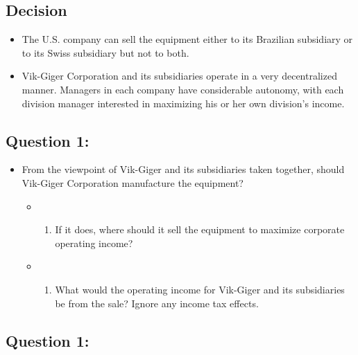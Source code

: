 \hypertarget{decision}{%
\subsection{Decision}\label{decision}}

\begin{itemize}
\tightlist
\item
  The U.S. company can sell the equipment either to its Brazilian
  subsidiary or to its Swiss subsidiary but not to both.
\item
  Vik-Giger Corporation and its subsidiaries operate in a very
  decentralized manner. Managers in each company have considerable
  autonomy, with each division manager interested in maximizing his or
  her own division's income.
\end{itemize}

\hypertarget{question-1}{%
\subsection{Question 1:}\label{question-1}}

\begin{itemize}
\tightlist
\item
  From the viewpoint of Vik-Giger and its subsidiaries taken together,
  should Vik-Giger Corporation manufacture the equipment?

  \begin{itemize}
  \item
    \begin{enumerate}
    \def\labelenumi{(\alph{enumi})}
    \tightlist
    \item
      If it does, where should it sell the equipment to maximize
      corporate operating income?
    \end{enumerate}
  \item
    \begin{enumerate}
    \def\labelenumi{(\alph{enumi})}
    \setcounter{enumi}{1}
    \tightlist
    \item
      What would the operating income for Vik-Giger and its subsidiaries
      be from the sale? Ignore any income tax effects.
    \end{enumerate}
  \end{itemize}
\end{itemize}

\hypertarget{question-1-1}{%
\subsection{Question 1:}\label{question-1-1}}

